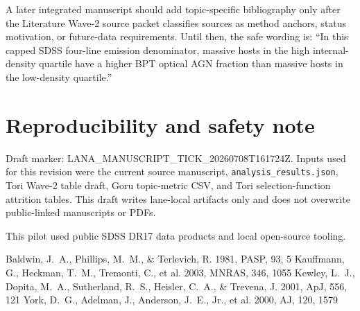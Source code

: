\documentclass[twocolumn]{aastex631}
\begin{document}
A later integrated manuscript should add topic-specific bibliography only after the Literature Wave-2 source packet classifies sources as method anchors, status motivation, or future-data requirements.  Until then, the safe wording is: ``In this capped SDSS four-line emission denominator, massive hosts in the high internal-density quartile have a higher BPT optical AGN fraction than massive hosts in the low-density quartile.''

\section*{Reproducibility and safety note}
Draft marker: LANA\_MANUSCRIPT\_TICK\_20260708T161724Z.  Inputs used for this revision were the current source manuscript, \texttt{analysis\_results.json}, Tori Wave-2 table draft, Goru topic-metric CSV, and Tori selection-function attrition tables.  This draft writes lane-local artifacts only and does not overwrite public-linked manuscripts or PDFs.

\acknowledgments
This pilot used public SDSS DR17 data products and local open-source tooling.

\begin{thebibliography}{}
 Baldwin, J.~A., Phillips, M.~M., \& Terlevich, R. 1981, PASP, 93, 5
 Kauffmann, G., Heckman, T.~M., Tremonti, C., et al. 2003, MNRAS, 346, 1055
 Kewley, L.~J., Dopita, M.~A., Sutherland, R.~S., Heisler, C.~A., \& Trevena, J. 2001, ApJ, 556, 121
 York, D.~G., Adelman, J., Anderson, J.~E., Jr., et al. 2000, AJ, 120, 1579
\end{thebibliography}
\end{document}
